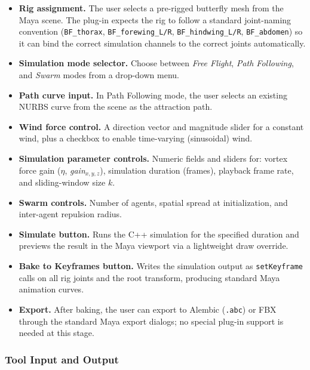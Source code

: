 \documentclass[12pt]{article}
\begin{document}
\begin{itemize}
  \item \textbf{Rig assignment.} The user selects a pre-rigged butterfly
    mesh from the Maya scene. The plug-in expects the rig to follow a
    standard joint-naming convention
    (\texttt{BF\_thorax}, \texttt{BF\_forewing\_L/R},
    \texttt{BF\_hindwing\_L/R}, \texttt{BF\_abdomen}) so it can bind the
    correct simulation channels to the correct joints automatically.

  \item \textbf{Simulation mode selector.} Choose between \textit{Free
    Flight}, \textit{Path Following}, and \textit{Swarm} modes from a
    drop-down menu.

  \item \textbf{Path curve input.} In Path Following mode, the user selects
    an existing NURBS curve from the scene as the attraction path.

  \item \textbf{Wind force control.} A direction vector and magnitude slider
    for a constant wind, plus a checkbox to enable time-varying (sinusoidal)
    wind.

  \item \textbf{Simulation parameter controls.} Numeric fields and sliders
    for: vortex force gain ($\eta$, \textit{gain}$_{x,y,z}$), simulation
    duration (frames), playback frame rate, and sliding-window size $k$.

  \item \textbf{Swarm controls.} Number of agents, spatial spread at
    initialization, and inter-agent repulsion radius.

  \item \textbf{Simulate button.} Runs the C++ simulation for the specified
    duration and previews the result in the Maya viewport via a lightweight
    draw override.

  \item \textbf{Bake to Keyframes button.} Writes the simulation output as
    \texttt{setKeyframe} calls on all rig joints and the root transform,
    producing standard Maya animation curves.

  \item \textbf{Export.} After baking, the user can export to Alembic
    (\texttt{.abc}) or FBX through the standard Maya export dialogs; no
    special plug-in support is needed at this stage.
\end{itemize}

\subsubsection{Tool Input and Output}
\end{document}
